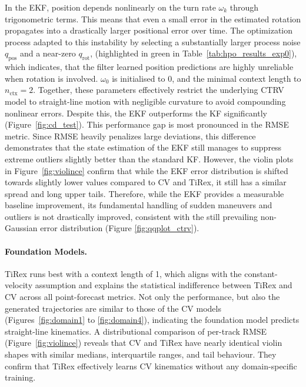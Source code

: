In the \ac{EKF}, position depends nonlinearly on the turn rate $\omega_k$ through trigonometric terms. This means that even a small error in the estimated rotation propagates into a drastically larger positional error over time.
The optimization process adapted to this instability by selecting a substantially larger process noise $q_\text{pos}$ and a near-zero $q_\text{rot}$, (highlighted in green in Table~\ref{tab:hpo_results_exp0}), which indicates, that the filter learned position predictions are highly unreliable when rotation is involved.
$\omega_0$ is initialised to $0$, and the minimal context length to $n_\text{ctx} = 2$.
Together, these parameters effectively restrict the underlying \ac{CTRV} model to straight-line motion with negligible curvature to avoid compounding nonlinear errors. %
Despite this, the \ac{EKF} outperforms the \ac{KF} significantly (Figure~\ref{fig:cd_test}).
This performance gap is most pronounced in the \ac{RMSE} metric.
Since \ac{RMSE} heavily penalizes large deviations, this difference demonstrates that the state estimation of the \ac{EKF}  still manages to suppress extreme outliers slightly better than the standard \ac{KF}.
However, the violin plots in Figure~\ref{fig:violince} confirm that while the \ac{EKF} error distribution is shifted towards slightly lower values compared to \ac{CV} and TiRex, it still has a similar spread and long upper tails.
Therefore, while the \ac{EKF} provides a measurable baseline improvement, its fundamental handling of sudden maneuvers and outliers is not drastically improved, consistent with the still prevailing non-Gaussian error distribution (Figure \ref{fig:qqplot_ctrv}).



\paragraph{Foundation Models.}
TiRex runs best with a context length of 1, which aligns with the constant-velocity assumption and explains the statistical indifference between TiRex and \ac{CV} across all point-forecast metrics.
Not only the performance, but also the generated trajectories are similar to those of the \ac{CV} models (Figures~\ref{fig:domain1} to \ref{fig:domain4}), indicating the foundation model predicts straight-line kinematics.
A distributional comparison of per-track \ac{RMSE} (Figure~\ref{fig:violince}) reveals that \ac{CV} and TiRex have nearly identical violin shapes with similar medians, interquartile ranges, and tail behaviour. They confirm that TiRex effectively learns \ac{CV} kinematics without any domain-specific training.

